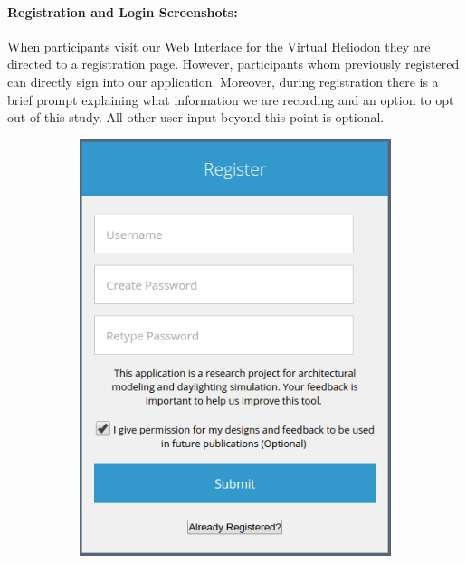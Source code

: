 \documentclass[12pt]{article}
\begin{document}
\newpage
\paragraph{Registration and Login Screenshots:}
When participants visit our Web Interface for the Virtual Heliodon they are directed to a registration page. 
However, participants whom previously registered can directly sign into our application. Moreover, during registration there is a brief prompt explaining what information we are recording and an option to opt out of this study. 
All other user input beyond this point is optional.


\begin{figure}[h]

  \begin{subfigure}{.5\textwidth}
    \centering
    \includegraphics[scale=0.5]{ss_reg}
  \end{subfigure}%
  \begin{subfigure}{.5\textwidth}
    \centering

\end{subfigure}
\end{figure}
\end{document}
